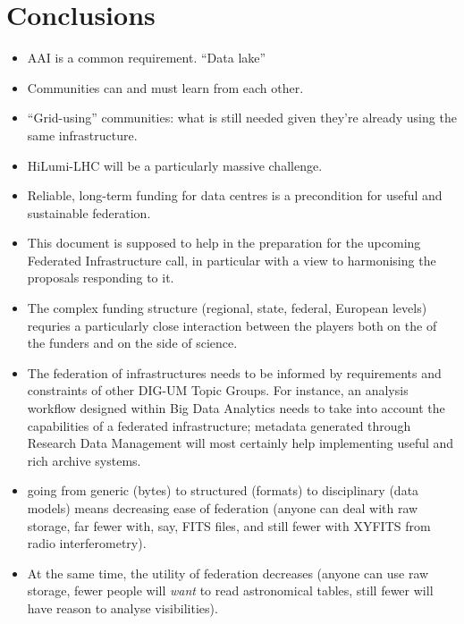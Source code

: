 \section{Conclusions}
\label{sect:conclusions}

\begin{itemize}
\item AAI is a common requirement.  ``Data lake'' 

\item Communities can and must learn from each other.

\item ``Grid-using'' communities: what is still needed given they're
already using the same infrastructure.

\item HiLumi-LHC will be a particularly massive challenge.

\item Reliable, long-term funding for data centres is a precondition for
useful and sustainable federation.

\item This document is supposed to help in the preparation for the
upcoming Federated Infrastructure call, in particular with a view to
harmonising the proposals responding to it.

\item The complex funding structure (regional, state, federal, European
levels) requries a particularly close interaction between the players
both on the of the funders and on the side of science.

\item The federation of infrastructures needs to be informed by
requirements and constraints of other DIG-UM Topic Groups.  For
instance, an analysis workflow designed within Big Data Analytics needs
to take into account the capabilities of a federated infrastructure;
metadata generated through Research Data Management will most certainly
help implementing useful and rich archive systems.

\item going from generic (bytes) to structured (formats) to
disciplinary (data models) means decreasing ease of federation (anyone
can deal with raw storage, far fewer with, say, FITS files, and still
fewer with XYFITS from radio interferometry).

\item At the same time, the utility of federation decreases (anyone can
use raw storage, fewer people will \emph{want} to read astronomical
tables, still fewer will have reason to analyse visibilities).


\end{itemize}

